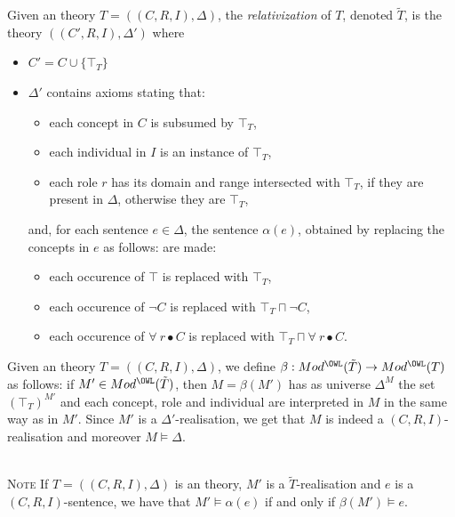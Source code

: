 \documentclass[10pt, a4paper]{isov2}
\renewenvironment{note}[0]{\ \\ \textsc{Note} \quad}{}
\begin{document}


\begin{definition}
Given an \OWL theory $T = ((C,R,I), \Delta)$,
the \emph{relativization} of $T$, denoted $\tilde{T}$, is the theory 
$((C',R,I),\Delta')$ where
\begin{itemize}
\item $C' = C\cup\{\top_T\}$
\item $\Delta'$ contains axioms stating that:
  \begin{itemize}
    \item each concept in $C$ is subsumed by $\top_T$,
    \item each individual in $I$ is an instance of $\top_T$,
    \item each role $r$ has its domain and range intersected with $\top_T$, if they
    are present in $\Delta$, otherwise they are $\top_T$,
  \end{itemize}
  \noindent and, for each sentence $e\in\Delta$, the sentence $\alpha(e)$, obtained by
  replacing the concepts in $e$ as follows:
  are made:
  \begin{itemize}
   \item each occurence of $\top$ is replaced with $\top_T$,
   \item each occurence of $\neg C$ is replaced with $\top_T \sqcap \neg C$,
   \item each occurence of $\forall~r\bullet C$ is replaced with 
   $\top_T \sqcap \forall~r\bullet C$.
  \end{itemize}
\end{itemize}
\end{definition}

\begin{definition}
Given an \OWL theory $T = ((C,R,I), \Delta)$,
we define $\beta: Mod^\OWL(\tilde{T}) \to Mod^\OWL(T)$ as follows: 
if $M'\in Mod^\OWL(\tilde{T})$, then $M=\beta(M')$ has as universe
$\Delta^M$ the set $(\top_T)^{M'}$ and each concept, role and individual are
interpreted in $M$ in the same way as in $M'$. Since $M'$ is a $\Delta'$-realisation,
we get that $M$ is indeed a $(C,R,I)$-realisation and moreover $M\models \Delta$.
\end{definition}

\begin{note}
If $T = ((C,R,I),\Delta)$ is an \OWL theory, $M'$ is a $\tilde{T}$-realisation and
$e$ is a $(C,R,I)$-sentence, we have that $M'\models \alpha(e)$ if and only if
$\beta(M')\models e$.
\end{note}
\end{document}
